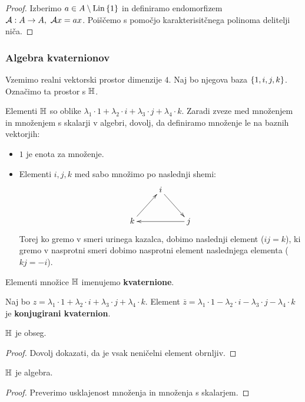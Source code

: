 \begin{proof}
    Izberimo $a \in A \setminus \operatorname{Lin} \left\{1\right\}$ in definiramo endomorfizem $\mathcal{A}: A \to A, \ \mathcal{A}x = ax$. Poiščemo s pomočjo karakterisitčnega polinoma delitelji niča.
\end{proof}

\subsubsection*{Algebra kvaternionov}
\begin{primer}
    Vzemimo realni vektorski prostor dimenzije $4$. Naj bo njegova baza $\left\{1, i, j, k\right\}$. Označimo ta prostor s $\mathbb{H}$.
    
    Elementi $\mathbb{H}$ so oblike $\lambda_1 \cdot 1 + \lambda_2 \cdot i + \lambda_3 \cdot j + \lambda_4 \cdot k$. Zaradi zveze med množenjem in množenjem s skalarji v algebri, dovolj, da definiramo množenje le na baznih vektorjih:
    \begin{itemize}
        \item $1$ je enota za množenje.
        \item Elementi $i, j, k$ med sabo množimo po naslednji shemi:
        $$\xymatrix{
            & i \ar@{->}[rd] &  \\
           k \ar@{->}[ru] &  & j \ar@{->}[ll]
           }$$
        Torej ko gremo v smeri urinega kazalca, dobimo naslednji element ($ij = k$), ki gremo v nasprotni smeri dobimo nasprotni element naslednjega elementa ($kj = -i$).
    \end{itemize}
    Elementi množice $\mathbb{H}$ imenujemo \textbf{kvaternione}.

    Naj bo $z = \lambda_1 \cdot 1 + \lambda_2 \cdot i + \lambda_3 \cdot j + \lambda_4 \cdot k$. Element $\overline{z} = \lambda_1 \cdot 1 - \lambda_2 \cdot i - \lambda_3 \cdot j - \lambda_4 \cdot k$ je \textbf{konjugirani kvaternion}.    
\end{primer}

\begin{trditev}
    $\mathbb{H}$ je obseg.
\end{trditev}

\begin{proof}
    Dovolj dokazati, da je vsak neničelni element obrnljiv.
\end{proof}

\begin{trditev}
    $\mathbb{H}$ je algebra.
\end{trditev}

\begin{proof}
    Preverimo usklajenost množenja in množenja s skalarjem.
\end{proof}

